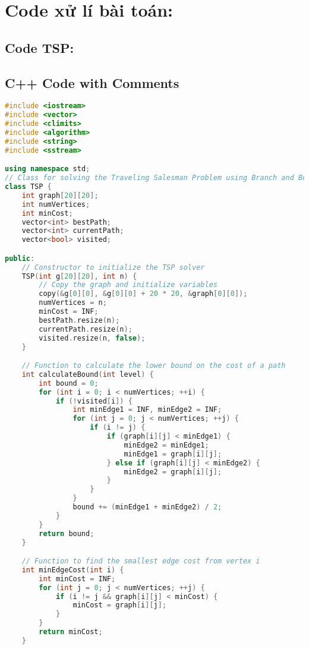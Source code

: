 \documentclass[a4paper]{article}
\begin{document}
\newpage
 
\section{Code xử lí bài toán:}\label{control}
\subsection{Code TSP: }\label{control}


\subsection*{C++ Code with Comments}

\begin{lstlisting}[language=C++, caption={Traveling Salesman Problem Solver - C++ Code with Comments}, style=cppstyle]
#include <iostream>
#include <vector>
#include <climits>
#include <algorithm>
#include <string>
#include <sstream>

using namespace std;
// Class for solving the Traveling Salesman Problem using Branch and Bound
class TSP {
    int graph[20][20];
    int numVertices;
    int minCost;
    vector<int> bestPath;
    vector<int> currentPath;
    vector<bool> visited;

public:
    // Constructor to initialize the TSP solver
    TSP(int g[20][20], int n) {
        // Copy the graph and initialize variables
        copy(&g[0][0], &g[0][0] + 20 * 20, &graph[0][0]);
        numVertices = n;
        minCost = INF;
        bestPath.resize(n);
        currentPath.resize(n);
        visited.resize(n, false);
    }

    // Function to calculate the lower bound on the cost of a path
    int calculateBound(int level) {
        int bound = 0;
        for (int i = 0; i < numVertices; ++i) {
            if (!visited[i]) {
                int minEdge1 = INF, minEdge2 = INF;
                for (int j = 0; j < numVertices; ++j) {
                    if (i != j) {
                        if (graph[i][j] < minEdge1) {
                            minEdge2 = minEdge1;
                            minEdge1 = graph[i][j];
                        } else if (graph[i][j] < minEdge2) {
                            minEdge2 = graph[i][j];
                        }
                    }
                }
                bound += (minEdge1 + minEdge2) / 2;
            }
        }
        return bound;
    }

    // Function to find the smallest edge cost from vertex i
    int minEdgeCost(int i) {
        int minCost = INF;
        for (int j = 0; j < numVertices; ++j) {
            if (i != j && graph[i][j] < minCost) {
                minCost = graph[i][j];
            }
        }
        return minCost;
    }


\end{lstlisting}
\end{document}
